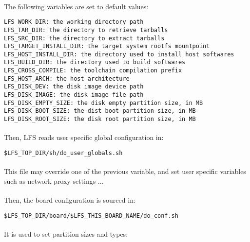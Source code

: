 \documentclass[a4paper, 11pt]{article}
\begin{document}
\paragraph{}
The following variables are set to default values:\\
\begin{lstlisting}[frame=tb]
LFS_WORK_DIR: the working directory path
LFS_TAR_DIR: the directory to retrieve tarballs
LFS_SRC_DIR: the directory to extract tarballs
LFS_TARGET_INSTALL_DIR: the target system rootfs mountpoint
LFS_HOST_INSTALL_DIR: the directory used to install host softwares
LFS_BUILD_DIR: the directory used to build softwares
LFS_CROSS_COMPILE: the toolchain compilation prefix
LFS_HOST_ARCH: the host architecture
LFS_DISK_DEV: the disk image device path
LFS_DISK_IMAGE: the disk image file path
LFS_DISK_EMPTY_SIZE: the disk empty partition size, in MB
LFS_DISK_BOOT_SIZE: the dist boot partition size, in MB
LFS_DISK_ROOT_SIZE: the disk root partition size, in MB
\end{lstlisting}

\paragraph{}
Then, LFS reads user specific global configuration in:\\

\begin{lstlisting}[frame=tb]
$LFS_TOP_DIR/sh/do_user_globals.sh
\end{lstlisting}

\paragraph{}
This file may override one of the previous variable, and set user specific
variables such as network proxy settings ...

\paragraph{}
Then, the board configuration is sourced in:\\

\begin{lstlisting}[frame=tb]
$LFS_TOP_DIR/board/$LFS_THIS_BOARD_NAME/do_conf.sh
\end{lstlisting}

\paragraph{}
It is used to set partition sizes and types:\\
\end{document}
